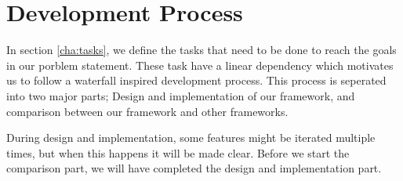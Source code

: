\section{Development Process}
In section \ref{cha:tasks}, we define the tasks that need to be done to reach the goals in our porblem statement. These task have a linear dependency which motivates us to follow a waterfall inspired development process. This process is seperated into two major parts; Design and implementation of our framework, and comparison between our framework and other frameworks. 

During design and implementation, some features might be iterated multiple times, but when this happens it will be made clear. Before we start the comparison part, we will have completed the design and implementation part.

